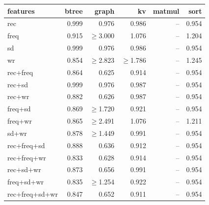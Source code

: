 \begin{tabular}{lrrrrr}
\toprule
features & btree & graph & kv & matmul & sort \\
\midrule
rec & 0.999 & 0.976 & 0.986 & -- & 0.954 \\
freq & 0.915 & $\geq$3.000 & 1.076 & -- & 1.204 \\
sd & 0.999 & 0.976 & 0.986 & -- & 0.954 \\
wr & 0.854 & $\geq$2.823 & $\geq$1.786 & -- & 1.245 \\
rec{+}freq & 0.864 & 0.625 & 0.914 & -- & 0.954 \\
rec{+}sd & 0.999 & 0.976 & 0.987 & -- & 0.954 \\
rec{+}wr & 0.882 & 0.626 & 0.987 & -- & 0.954 \\
freq{+}sd & 0.869 & $\geq$1.720 & 0.921 & -- & 0.954 \\
freq{+}wr & 0.865 & $\geq$2.491 & 1.076 & -- & 1.211 \\
sd{+}wr & 0.878 & $\geq$1.449 & 0.991 & -- & 0.954 \\
rec{+}freq{+}sd & 0.888 & 0.636 & 0.912 & -- & 0.954 \\
rec{+}freq{+}wr & 0.833 & 0.628 & 0.914 & -- & 0.954 \\
rec{+}sd{+}wr & 0.873 & 0.656 & 0.991 & -- & 0.954 \\
freq{+}sd{+}wr & 0.835 & $\geq$1.254 & 0.922 & -- & 0.954 \\
rec{+}freq{+}sd{+}wr & 0.847 & 0.652 & 0.911 & -- & 0.954 \\
\bottomrule
\end{tabular}
